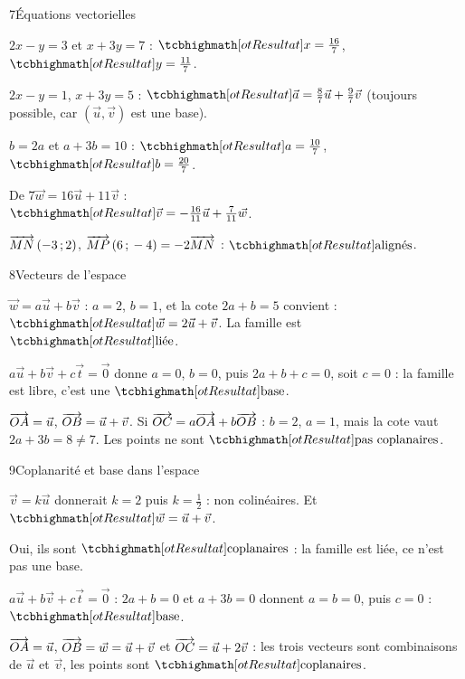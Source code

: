\begin{deuxcolonnes}
\begin{corrige}{7}{Équations vectorielles}
\begin{questions}
  \item $2x-y=3$ et $x+3y=7$ : $\res{x=\tfrac{16}{7}}$, $\res{y=\tfrac{11}{7}}$.
  \item $2x-y=1$, $x+3y=5$ : $\res{\vec a=\tfrac87\vec u+\tfrac97\vec v}$ (toujours possible, car $(\vec u,\vec v)$ est une base).
  \item $b=2a$ et $a+3b=10$ : $\res{a=\tfrac{10}{7}}$, $\res{b=\tfrac{20}{7}}$.
  \item De $7\vec w=16\vec u+11\vec v$ :\\ $\res{\vec v=-\tfrac{16}{11}\vec u+\tfrac{7}{11}\vec w}$.
  \item $\overrightarrow{MN}\,(-3\,{;}\,2)$, $\overrightarrow{MP}\,(6\,{;}\,-4)=-2\overrightarrow{MN}$ : $\res{\text{alignés}}$.
\end{questions}
\end{corrige}

\begin{corrige}{8}{Vecteurs de l'espace}
\begin{questions}
  \item $\vec w=a\vec u+b\vec v$ : $a=2$, $b=1$, et la cote $2a+b=5$ convient : $\res{\vec w=2\vec u+\vec v}$. La famille est
    $\res{\text{liée}}$.
  \item $a\vec u+b\vec v+c\vec t=\vec0$ donne $a=0$, $b=0$, puis $2a+b+c=0$, soit $c=0$ : la famille est libre, c'est une
    $\res{\text{base}}$.
  \item $\overrightarrow{OA}=\vec u$, $\overrightarrow{OB}=\vec u+\vec v$. Si $\overrightarrow{OC}=a\overrightarrow{OA}+b\overrightarrow{OB}$ : $b=2$, $a=1$, mais la cote vaut
    $2a+3b=8\neq7$. Les points ne sont $\res{\text{pas coplanaires}}$.
\end{questions}
\end{corrige}

\begin{corrige}{9}{Coplanarité et base dans l'espace}
\begin{questions}
  \item $\vec v=k\vec u$ donnerait $k=2$ puis $k=\frac12$ : non colinéaires. Et $\res{\vec w=\vec u+\vec v}$.
  \item Oui, ils sont $\res{\text{coplanaires}}$ : la famille est liée, ce n'est pas une base.
  \item $a\vec u+b\vec v+c\vec t=\vec0$ : $2a+b=0$ et $a+3b=0$ donnent $a=b=0$, puis $c=0$ : $\res{\text{base}}$.
  \item $\overrightarrow{OA}=\vec u$, $\overrightarrow{OB}=\vec w=\vec u+\vec v$ et $\overrightarrow{OC}=\vec u+2\vec v$ : les trois vecteurs sont combinaisons de
    $\vec u$ et $\vec v$, les points sont $\res{\text{coplanaires}}$.
\end{questions}
\end{corrige}

\end{deuxcolonnes}

